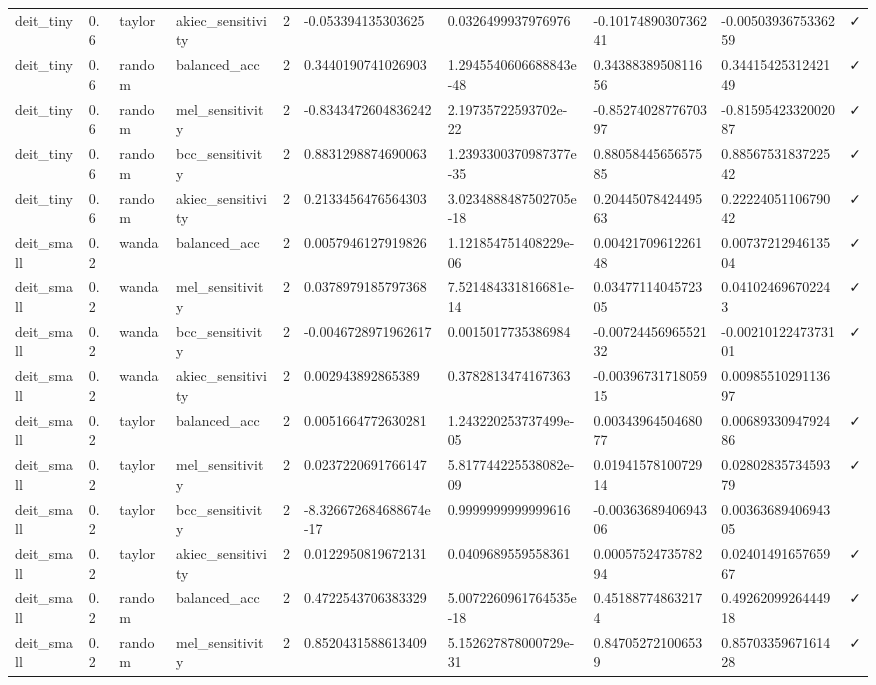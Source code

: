 \begin{table}[t]
\begin{tabular}{llllllllll}
deit\_tiny & 0.6 & taylor & akiec\_sensitivity & 2 & -0.053394135303625 & 0.0326499937976976 & -0.1017489030736241 & -0.0050393675336259 & ✓ \\
deit\_tiny & 0.6 & random & balanced\_acc & 2 & 0.3440190741026903 & 1.2945540606688843e-48 & 0.3438838950811656 & 0.3441542531242149 & ✓ \\
deit\_tiny & 0.6 & random & mel\_sensitivity & 2 & -0.8343472604836242 & 2.19735722593702e-22 & -0.8527402877670397 & -0.8159542332002087 & ✓ \\
deit\_tiny & 0.6 & random & bcc\_sensitivity & 2 & 0.8831298874690063 & 1.2393300370987377e-35 & 0.8805844565657585 & 0.8856753183722542 & ✓ \\
deit\_tiny & 0.6 & random & akiec\_sensitivity & 2 & 0.2133456476564303 & 3.0234888487502705e-18 & 0.2044507842449563 & 0.2222405110679042 & ✓ \\
deit\_small & 0.2 & wanda & balanced\_acc & 2 & 0.0057946127919826 & 1.121854751408229e-06 & 0.0042170961226148 & 0.0073721294613504 & ✓ \\
deit\_small & 0.2 & wanda & mel\_sensitivity & 2 & 0.0378979185797368 & 7.521484331816681e-14 & 0.0347711404572305 & 0.041024696702243 & ✓ \\
deit\_small & 0.2 & wanda & bcc\_sensitivity & 2 & -0.0046728971962617 & 0.0015017735386984 & -0.0072445696552132 & -0.0021012247373101 & ✓ \\
deit\_small & 0.2 & wanda & akiec\_sensitivity & 2 & 0.002943892865389 & 0.3782813474167363 & -0.0039673171805915 & 0.0098551029113697 &   \\
deit\_small & 0.2 & taylor & balanced\_acc & 2 & 0.0051664772630281 & 1.243220253737499e-05 & 0.0034396450468077 & 0.0068933094792486 & ✓ \\
deit\_small & 0.2 & taylor & mel\_sensitivity & 2 & 0.0237220691766147 & 5.817744225538082e-09 & 0.0194157810072914 & 0.0280283573459379 & ✓ \\
deit\_small & 0.2 & taylor & bcc\_sensitivity & 2 & -8.326672684688674e-17 & 0.9999999999999616 & -0.0036368940694306 & 0.0036368940694305 &   \\
deit\_small & 0.2 & taylor & akiec\_sensitivity & 2 & 0.0122950819672131 & 0.0409689559558361 & 0.0005752473578294 & 0.0240149165765967 & ✓ \\
deit\_small & 0.2 & random & balanced\_acc & 2 & 0.4722543706383329 & 5.0072260961764535e-18 & 0.451887748632174 & 0.4926209926444918 & ✓ \\
deit\_small & 0.2 & random & mel\_sensitivity & 2 & 0.8520431588613409 & 5.152627878000729e-31 & 0.847052721006539 & 0.8570335967161428 & ✓ \\

\end{tabular}
\end{table}
